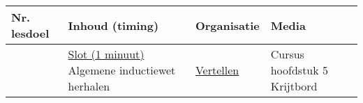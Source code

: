 \begin{landscape}
\begin{tabularx}{1.56\textwidth}{|p{1.5cm}|p{6.5cm}|X|p{4cm}|}
	\hline
	\textbf{Nr. lesdoel } & \textbf{Inhoud (timing)}  & \textbf{Organisatie } & \textbf{Media } \\ \hline
	& \underline{Slot (1 minuut)}\newline
	Algemene inductiewet herhalen	
	&  \underline{Vertellen}\newline 
	&  Cursus hoofdstuk 5 \newline\newline Krijtbord
	\\ \hline
\end{tabularx}

	
\end{landscape}



%
%
%
%
%
%
%
%
%
%